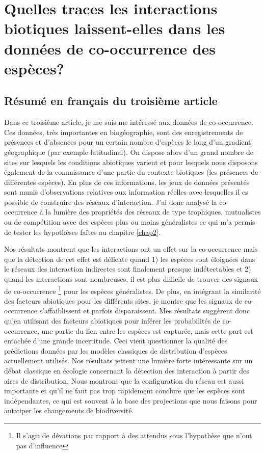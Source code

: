 \chapter{Quelles traces les interactions biotiques laissent-elles dans les données de co-occurrence des espèces?}
\label{chap3}

\section{Résumé en français du troisième article}

Dans ce troisième article, je me suis me intéressé aux données de co-occurrence.
Ces données, très importantes en biogéographie, sont des enregistrements
de présences et d'absences pour un certain nombre d'espèces
le long d'un gradient géographique (par exemple latitudinal).
On dispose alors d’un grand nombre de sites sur lesquels les conditions abiotiques
varient et pour lesquels nous disposons également de la connaissance
d’une partie du contexte biotiques (les présences de différentes espèces).
En plus de ces informations, les jeux de données présentés sont munis
d’observations relatives aux information réelles avec lesquelles il es possible
de construire des réseaux d'interaction. J'ai donc analysé la co-occurrence à la
lumière des propriétés des réseaux de type trophiques, mutualistes ou de compétition
avec des espèces plus ou moins généralistes ce qui m’a permis de tester les
hypothèses faîtes au chapitre \ref{chap2}.


Nos résultats montrent que les interactions ont un effet sur la co-occurrence
mais que la détection de cet effet est délicate quand 1) les espèces sont éloignées
dans le réseaux :les interaction indirectes sont finalement presque
indétectables et 2) quand les interactions sont nombreuses, il est plus
difficile de trouver des signaux de co-occurrence \footnote{Il s'agit de
dévations par rapport à des attendus sous l'hypothèse que n'ont pas d'influence}
pour les espèces généralistes. De plus, en intégrant la similarité des facteurs
abiotiques pour les différents sites, je montre que les signaux de
co-occurrence s’affaiblissent et parfois disparaissent. Mes résultats suggèrent
donc qu’en utilisant des facteurs abiotiques pour inférer les probabilités de
co-occurrence, une partie du lien entre les espèces est capturée, mais cette
part est entachée d’une grande incertitude. Ceci vient questionner la
qualité des prédictions données par les modèles classiques de distribution
d'espèces actuellement utilisés. Nos résultats jettent une lumière forte
intéressante sur un débat classique en
écologie concernant la détection des interaction à partir des aires de
distribution. Nous montrons que la configuration du réseau est aussi
importante et qu’il ne faut pas trop rapidement conclure que les espèces sont
indépendantes, ce qui est souvent à la base des projections que nous faisons
pour anticiper les changements de biodiversité.




